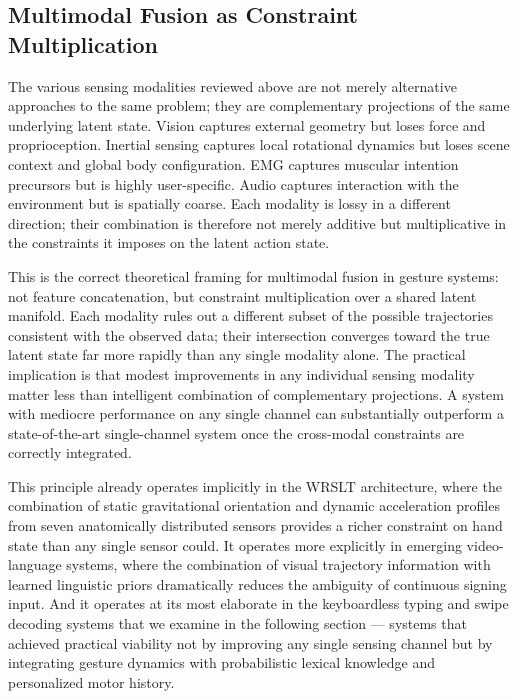 \documentclass[11pt, a4paper]{article}
\theoremstyle{definition}
\begin{document}
\subsection{Multimodal Fusion as Constraint Multiplication}

The various sensing modalities reviewed above are not merely alternative approaches to the same problem; they are complementary projections of the same underlying latent state. Vision captures external geometry but loses force and proprioception. Inertial sensing captures local rotational dynamics but loses scene context and global body configuration. EMG captures muscular intention precursors but is highly user-specific. Audio captures interaction with the environment but is spatially coarse. Each modality is lossy in a different direction; their combination is therefore not merely additive but multiplicative in the constraints it imposes on the latent action state.

This is the correct theoretical framing for multimodal fusion in gesture systems: not feature concatenation, but constraint multiplication over a shared latent manifold. Each modality rules out a different subset of the possible trajectories consistent with the observed data; their intersection converges toward the true latent state far more rapidly than any single modality alone. The practical implication is that modest improvements in any individual sensing modality matter less than intelligent combination of complementary projections. A system with mediocre performance on any single channel can substantially outperform a state-of-the-art single-channel system once the cross-modal constraints are correctly integrated.

This principle already operates implicitly in the WRSLT architecture, where the combination of static gravitational orientation and dynamic acceleration profiles from seven anatomically distributed sensors provides a richer constraint on hand state than any single sensor could. It operates more explicitly in emerging video-language systems, where the combination of visual trajectory information with learned linguistic priors dramatically reduces the ambiguity of continuous signing input. And it operates at its most elaborate in the keyboardless typing and swipe decoding systems that we examine in the following section --- systems that achieved practical viability not by improving any single sensing channel but by integrating gesture dynamics with probabilistic lexical knowledge and personalized motor history.
\end{document}
